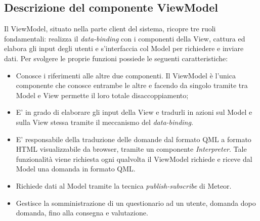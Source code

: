 	\subsection{Descrizione del componente ViewModel}
	Il ViewModel, situato nella parte client del sistema, ricopre tre ruoli fondamentali: realizza il \emph{data-binding} con i componenti della View, cattura ed elabora gli input degli utenti e s'interfaccia col Model per richiedere e inviare dati. Per svolgere le proprie funzioni possiede le seguenti caratteristiche:
	\begin{itemize}
		\item Conosce i riferimenti alle altre due componenti. Il ViewModel è l'unica componente che conosce entrambe le altre e facendo da singolo tramite tra Model e View permette il loro totale disaccoppiamento;
		\item E' in grado di elaborare gli input della View e tradurli in azioni sul Model e sulla View stessa tramite il meccanismo del \emph{data-binding}.  
		\item E' responsabile della traduzione delle domande dal formato QML a formato HTML visualizzabile da browser, tramite un componente \emph{Interpreter}.  Tale funzionalità viene richiesta ogni qualvolta il ViewModel richiede e riceve dal Model una domanda in formato QML.
		\item Richiede dati al Model tramite la tecnica \emph{publish-subscribe} di Meteor.
		\item Gestisce la somministrazione di un questionario ad un utente, domanda dopo domanda, fino alla consegna e valutazione.
	\end{itemize}
	\newpage